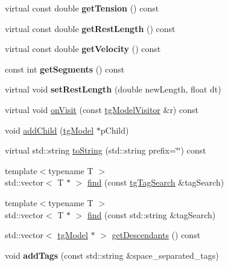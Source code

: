 \begin{DoxyCompactItemize}
\item 
\hypertarget{classtg_r_b_string_a0fb90907d266c82d36706b36f5966caa}{virtual const double {\bfseries get\-Tension} () const }\label{classtg_r_b_string_a0fb90907d266c82d36706b36f5966caa}

\item 
\hypertarget{classtg_r_b_string_aef08cb5d8b064a5e8055701f2becc599}{virtual const double {\bfseries get\-Rest\-Length} () const }\label{classtg_r_b_string_aef08cb5d8b064a5e8055701f2becc599}

\item 
\hypertarget{classtg_r_b_string_a859a025b815668221c06ca34b603fb4d}{virtual const double {\bfseries get\-Velocity} () const }\label{classtg_r_b_string_a859a025b815668221c06ca34b603fb4d}

\item 
\hypertarget{classtg_r_b_string_a9e9660738e6b1537bd453c58e741d922}{const int {\bfseries get\-Segments} () const }\label{classtg_r_b_string_a9e9660738e6b1537bd453c58e741d922}

\item 
\hypertarget{classtg_base_string_a51c3d44ae19042cb3918ce8847888bc9}{virtual void {\bfseries set\-Rest\-Length} (double new\-Length, float dt)}\label{classtg_base_string_a51c3d44ae19042cb3918ce8847888bc9}

\item 
virtual void \hyperlink{classtg_model_aee6457e0fc54d5570b87bfc779f9b1c0}{on\-Visit} (const \hyperlink{classtg_model_visitor}{tg\-Model\-Visitor} \&r) const 
\item 
void \hyperlink{classtg_model_a292c17848b96caee32b2286e44c13f2f}{add\-Child} (\hyperlink{classtg_model}{tg\-Model} $\ast$p\-Child)
\item 
virtual std\-::string \hyperlink{classtg_model_af37b0c1a6d4060bfe0bb9b5038a17725}{to\-String} (std\-::string prefix=\char`\"{}\char`\"{}) const 
\item 
{\footnotesize template$<$typename T $>$ }\\std\-::vector$<$ T $\ast$ $>$ \hyperlink{classtg_model_ab75836fdfbd9200f165c3b28a19630c0}{find} (const \hyperlink{classtg_tag_search}{tg\-Tag\-Search} \&tag\-Search)
\item 
{\footnotesize template$<$typename T $>$ }\\std\-::vector$<$ T $\ast$ $>$ \hyperlink{classtg_model_aa40b5fb32f8941e04d537f4e6c6db35c}{find} (const std\-::string \&tag\-Search)
\item 
std\-::vector$<$ \hyperlink{classtg_model}{tg\-Model} $\ast$ $>$ \hyperlink{classtg_model_a2efa4321fa5c77b4ce23b01f6fd3a1c4}{get\-Descendants} () const 
\item 
\hypertarget{classtg_taggable_af0b8f1729653b0b90d2fecbd51163612}{void {\bfseries add\-Tags} (const std\-::string \&space\-\_\-separated\-\_\-tags)}\label{classtg_taggable_af0b8f1729653b0b90d2fecbd51163612}


\end{DoxyCompactItemize}
